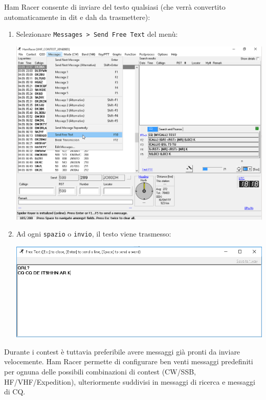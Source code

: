 Ham Racer consente di inviare del testo qualsiasi (che verr\`a convertito automaticamente in dit e dah da trasmettere):
\begin{enumerate}
	\item Selezionare \texttt{Messages > Send Free Text} del men\`u:
	\begin{center}
		\includegraphics[width=\linewidth]{./use01.png}
	\end{center}
	\item Ad ogni \texttt{spazio} o \texttt{invio}, il testo viene trasmesso:
	\begin{center}
		\includegraphics[width=\linewidth]{./use02.png}
	\end{center}
\end{enumerate}

Durante i contest \`e tuttavia preferibile avere messaggi gi\`a pronti da inviare velocemente. Ham Racer permette di configurare ben venti messaggi predefiniti per ognuna delle possibili combinazioni di contest (CW/SSB, HF/VHF/Expedition), ulteriormente suddivisi in messaggi di ricerca e messaggi di CQ.

